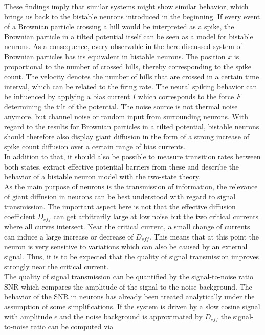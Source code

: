 \documentclass[12pt,a4paper]{article}
\begin{document}
These findings imply that similar systems might show similar behavior, which brings us back to the bistable neurons introduced in the beginning. If every event of a Brownian particle crossing a hill would be interpreted as a spike, the Brownian particle in a tilted potential itself can be seen as a model for bistable neurons. As a consequence, every observable in the here discussed system of Brownian particles has its equivalent in bistable neurons. The position $x$ is proportional to the number of crossed hills, thereby corresponding to the spike count. The velocity denotes the number of hills that are crossed in a certain time interval, which can be related to the firing rate. The neural spiking behavior can be influenced by applying a bias current $I$ which corresponds to the force $F$ determining the tilt of the potential. The noise source is not thermal noise anymore, but channel noise or random input from surrounding neurons. With regard to the results for Brownian particles in a tilted potential, bistable neurons should therefore also display giant diffusion in the form of a strong increase of spike count diffusion over a certain range of bias currents.
\\
In addition to that, it should also be possible to measure transition rates between both states, extract effective potential barriers from these and describe the behavior of a bistable neuron model with the two-state theory. 
\\
As the main purpose of neurons is the transmission of information, the relevance of giant diffusion in neurons can be best understood with regard to signal transmission. The important aspect here is not that the effective diffusion coefficient $D_{eff}$ can get arbitrarily large at low noise but the two critical currents where all curves intersect. Near the critical current, a small change of currents can induce a large increase or decrease of $D_{eff}$. This means that at this point the neuron is very sensitive to variations which can also be caused by an external signal. Thus, it is to be expected that the quality of signal transmission improves strongly near the critical current.
\\
The quality of signal transmission can be quantified by the signal-to-noise ratio SNR which compares the amplitude of the signal to the noise background. The behavior of the SNR in neurons has already been treated analytically under the assumption of some simplifications. If the system is driven by a slow cosine signal with amplitude $\epsilon$ and the noise background is approximated by $D_{eff}$ the signal-to-noise ratio can be computed via\cite{snr}
\end{document}
